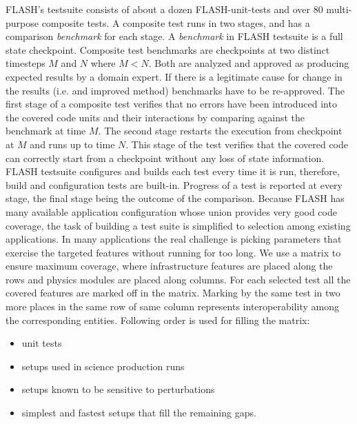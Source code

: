 FLASH's testsuite consists of about a dozen {FLASH-unit-tests} and
over $80$ multi-purpose composite tests. A composite test runs in two
stages, and has a comparison {\em benchmark} for each stage. A {\em
  benchmark} in FLASH testsuite is a full state checkpoint. Composite
test benchmarks are checkpoints at two distinct timesteps $M$ and $N$ where
$M < N$. Both are analyzed and approved as producing expected results
by a domain expert. If there is a legitimate cause for change in the
results (i.e. and improved method) benchmarks have to be
re-approved. The first stage of a composite  test verifies that no
errors have been introduced into the covered code units and their interactions
by comparing against the benchmark at time $M$. The second
stage restarts the execution from checkpoint at $M$ and runs up to
time $N$. This stage of the test verifies that the covered code can
correctly start from a checkpoint without any loss of state
information. FLASH testsuite configures and builds each test every
time it is run, therefore, build and configuration tests are
built-in. Progress of a test is reported at every stage, the final
stage being the outcome of the comparison. Because FLASH has many
available application configuration whose union provides  
very good code coverage, the task of building a test suite is simplified
to selection among existing applications. In many applications the
real challenge is picking parameters that exercise the targeted
features without running for too long. We use a matrix
to ensure maximum coverage, where infrastructure features are placed
along the rows and physics modules are placed along columns. For each
selected test all the covered features are marked off in the
matrix. Marking by the same test in two more places in the same row of
same column represents interoperability among the corresponding
entities. Following order is used
for filling the matrix:
\begin{itemize}
\item unit tests
\item setups used in science production runs
\item setups known to be sensitive to perturbations
\item simplest and fastest setups that fill the remaining gaps. 
\end{itemize} 

